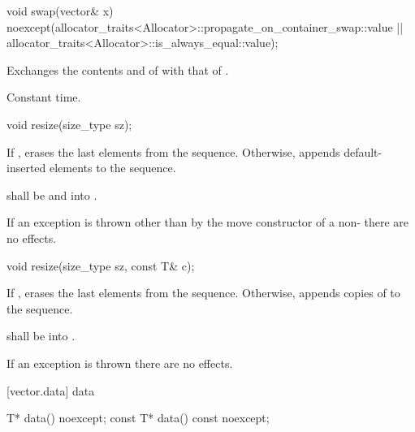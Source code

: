 %
\begin{itemdecl}
void swap(vector& x)
  noexcept(allocator_traits<Allocator>::propagate_on_container_swap::value ||
           allocator_traits<Allocator>::is_always_equal::value);
\end{itemdecl}

\begin{itemdescr}
\pnum
\effects
Exchanges the contents and
of
with that of .

\pnum
\complexity
Constant time.
\end{itemdescr}

%
\begin{itemdecl}
void resize(size_type sz);
\end{itemdecl}

\begin{itemdescr}
\pnum
\effects If , erases the last  elements
from the sequence. Otherwise,
appends  default-inserted elements to the sequence.

\pnum
\requires {} shall be
 and  into .

\pnum
\remarks If an exception is thrown other than by the move constructor of a non-
 there are no effects.
\end{itemdescr}

%
\begin{itemdecl}
void resize(size_type sz, const T& c);
\end{itemdecl}

\begin{itemdescr}
\pnum
\effects If , erases the last  elements
from the sequence. Otherwise,
appends  copies of  to the sequence.

\pnum
\requires {} shall be
 into .

\pnum
\remarks If an exception is thrown there are no effects.
\end{itemdescr}

[vector.data]{ data}

%
\begin{itemdecl}
T*         data() noexcept;
const T*   data() const noexcept;
\end{itemdecl}


